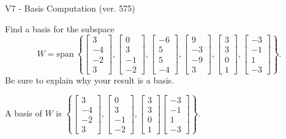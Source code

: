 \begin{exercise}
  \begin{exerciseTitle}V7 - Basis Computation (ver. 575)\end{exerciseTitle}
  \begin{exerciseStatement}
    Find a basis for the subspace 
\[W=\mathrm{span}\ \left\{\left[\begin{array}{r}
3 \\
-4 \\
-2 \\
3
\end{array}\right] , \left[\begin{array}{r}
0 \\
3 \\
-1 \\
-2
\end{array}\right] , \left[\begin{array}{r}
-6 \\
5 \\
5 \\
-4
\end{array}\right] , \left[\begin{array}{r}
9 \\
-3 \\
-9 \\
3
\end{array}\right] , \left[\begin{array}{r}
3 \\
3 \\
0 \\
1
\end{array}\right] , \left[\begin{array}{r}
-3 \\
-1 \\
1 \\
-3
\end{array}\right]\right\}.\]
 Be sure to explain why your result is a basis.


  \end{exerciseStatement}
  \begin{exerciseAnswer}
   A basis of \(W\) is  \(\left\{\left[\begin{array}{r}
3 \\
-4 \\
-2 \\
3
\end{array}\right] , \left[\begin{array}{r}
0 \\
3 \\
-1 \\
-2
\end{array}\right] , \left[\begin{array}{r}
3 \\
3 \\
0 \\
1
\end{array}\right] \left[\begin{array}{r}
-3 \\
-1 \\
1 \\
-3
\end{array}\right]\right\}\).
  


  \end{exerciseAnswer}
\end{exercise}